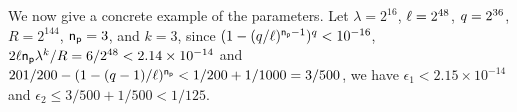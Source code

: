 We now give a concrete example of the parameters.
Let $\lambda = 2^{16}$, $\ell = 2^{48}$, $q = 2^{36}$, $R = 2^{144}$, $\mathsf{n_p}=3$, and $k = 3$, since $(1-(q/\ell)^{\mathsf{n_p}-1})^{q} < 10^{-16}$, $2\ell\mathsf{n_p}\lambda^{k}/R = 6/2^{48}<2.14 \times 10^{-14}$ and $201/200-(1-(q-1)/\ell)^{\mathsf{n_p}}< 1/200+1/1000 = 3/500$, we have $\epsilon_1 < 2.15 \times 10^{-14}$ and
	$ \epsilon_2 \leq 3/500 + 1/500 < 1/125.$
	
